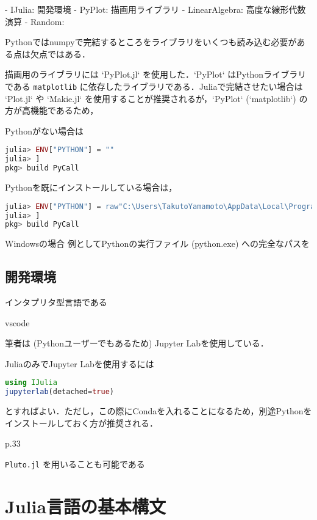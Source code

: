 \documentclass[titlepage]{ltjsbook}
\newcommand{\jl}{\lstinline[language=julia]}
\begin{document}
- IJulia: 開発環境
- PyPlot: 描画用ライブラリ
- LinearAlgebra: 高度な線形代数演算
- Random: 

Pythonではnumpyで完結するところをライブラリをいくつも読み込む必要がある点は欠点ではある．

描画用のライブラリには `PyPlot.jl` を使用した．`PyPlot` はPythonライブラリである \jl{matplotlib} に依存したライブラリである．Juliaで完結させたい場合は `Plot.jl` や `Makie.jl` を使用することが推奨されるが，`PyPlot` (`matplotlib`) の方が高機能であるため，

Pythonがない場合は

\begin{lstlisting}[language=julia]
julia> ENV["PYTHON"] = ""
julia> ]
pkg> build PyCall
\end{lstlisting}

Pythonを既にインストールしている場合は，

\begin{lstlisting}[language=julia]
julia> ENV["PYTHON"] = raw"C:\Users\TakutoYamamoto\AppData\Local\Programs\Python\Python312\python.exe"
julia> ]
pkg> build PyCall
\end{lstlisting}

Windowsの場合
例としてPythonの実行ファイル (python.exe) への完全なパスを


\subsection{開発環境}

インタプリタ型言語である

vscode

筆者は (Pythonユーザーでもあるため) Jupyter Labを使用している．

JuliaのみでJupyter Labを使用するには

\begin{lstlisting}[language=julia]
using IJulia
jupyterlab(detached=true)
\end{lstlisting}

とすればよい．ただし，この際にCondaを入れることになるため，別途Pythonをインストールしておく方が推奨される．

p.33

\jl{Pluto.jl} を用いることも可能である

\section{Julia言語の基本構文}

\end{document}
